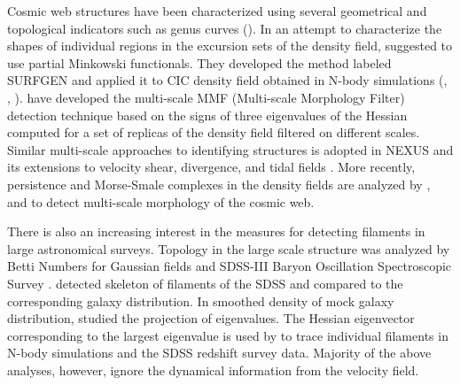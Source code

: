 Cosmic web structures have been characterized using several geometrical and topological indicators such as genus curves (\cite{Gott1986}). In an attempt to characterize the shapes of  individual regions in the excursion sets of the density field, \cite{Sahni1998} suggested to use partial Minkowski functionals. They developed the method labeled SURFGEN and applied it to CIC density field obtained in N-body simulations 
(\citealt{Sathyaprakash1998}, \citealt{Sheth2003}, \citealt{Shandarin2004}). \cite{Aragon-Calvo2007} have developed the multi-scale MMF (Multi-scale Morphology Filter) detection technique based on the signs of three eigenvalues of the Hessian computed for  a set of replicas of the density field filtered on different scales. Similar multi-scale approaches to identifying structures is adopted in NEXUS and its extensions to velocity shear, divergence, and tidal fields \cite{Cautun2013}. More recently, persistence and Morse-Smale complexes in the density fields are analyzed by \cite{Sousbie2011f}, \cite{Sousbie2011e} and \cite{Shivshankar2015a} to detect multi-scale morphology of the cosmic web.


There is also an increasing interest in the measures for detecting filaments in large astronomical surveys. Topology in the large scale structure was analyzed by Betti Numbers for Gaussian fields \citep{Park2013} and SDSS-III Baryon Oscillation Spectroscopic Survey \citep{Parihar2014}. \cite{Sousbie2008c} detected skeleton of filaments of the SDSS and compared to the corresponding galaxy distribution. In smoothed density of mock galaxy distribution, \cite{Bond2010a} studied the projection of eigenvalues. The Hessian eigenvector corresponding to the largest eigenvalue is used by \cite{Bond2010b} to trace individual filaments in N-body simulations and the SDSS redshift survey data. Majority of the above analyses, however, ignore the dynamical information from the velocity field.




